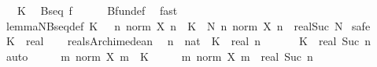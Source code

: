 \begin{isabellebody}
\ {\isacartoucheopen}{}\ {\isacharless}{\kern0pt}\ K{\isacartoucheclose}\ \isamarkupfalse%
\ {\isachardoublequoteopen}Bseq\ f{\isachardoublequoteclose}\isanewline
\ \ \ \ \isamarkupfalse%
\ Bfun{\isacharunderscore}{\kern0pt}def\ \isamarkupfalse%
\ fast\isanewline
{}\isamarkupfalse%
%
\endisatagproof
{\isafoldproof}%
%
\isadelimproof
\isanewline
%
\endisadelimproof
\isanewline
{}\isamarkupfalse%
\ lemma{\isacharunderscore}{\kern0pt}NBseq{\isacharunderscore}{\kern0pt}def{\isacharcolon}{\kern0pt}\ {\isachardoublequoteopen}{\isacharparenleft}{\kern0pt}{\isasymexists}K\ {\isachargreater}{\kern0pt}\ {}{\isachardot}{\kern0pt}\ {\isasymforall}n{\isachardot}{\kern0pt}\ norm\ {\isacharparenleft}{\kern0pt}X\ n{\isacharparenright}{\kern0pt}\ {\isasymle}\ K{\isacharparenright}{\kern0pt}\ {\isasymlongleftrightarrow}\ {\isacharparenleft}{\kern0pt}{\isasymexists}N{\isachardot}{\kern0pt}\ {\isasymforall}n{\isachardot}{\kern0pt}\ norm\ {\isacharparenleft}{\kern0pt}X\ n{\isacharparenright}{\kern0pt}\ {\isasymle}\ real{\isacharparenleft}{\kern0pt}Suc\ N{\isacharparenright}{\kern0pt}{\isacharparenright}{\kern0pt}{\isachardoublequoteclose}\isanewline
%
\isadelimproof
%
\endisadelimproof
%
\isatagproof
{}\isamarkupfalse%
\ safe\isanewline
\ \ \isamarkupfalse%
\ K\ {\isacharcolon}{\kern0pt}{\isacharcolon}{\kern0pt}\ real\isanewline
\ \ \isamarkupfalse%
\ reals{\isacharunderscore}{\kern0pt}Archimedean{}\ \isamarkupfalse%
\ n\ {\isacharcolon}{\kern0pt}{\isacharcolon}{\kern0pt}\ nat\ \ {\isachardoublequoteopen}K\ {\isacharless}{\kern0pt}\ real\ n{\isachardoublequoteclose}\ \isacommand{{\isachardot}{\kern0pt}{\isachardot}{\kern0pt}}\isamarkupfalse%
\isanewline
\ \ \isamarkupfalse%
\ \isamarkupfalse%
\ {\isachardoublequoteopen}K\ {\isasymle}\ real\ {\isacharparenleft}{\kern0pt}Suc\ n{\isacharparenright}{\kern0pt}{\isachardoublequoteclose}\ \isamarkupfalse%
\ auto\isanewline
\ \ \isamarkupfalse%
\ \isamarkupfalse%
\ {\isachardoublequoteopen}{\isasymforall}m{\isachardot}{\kern0pt}\ norm\ {\isacharparenleft}{\kern0pt}X\ m{\isacharparenright}{\kern0pt}\ {\isasymle}\ K{\isachardoublequoteclose}\isanewline
\ \ \isamarkupfalse%
\ \isamarkupfalse%
\ {\isachardoublequoteopen}{\isasymforall}m{\isachardot}{\kern0pt}\ norm\ {\isacharparenleft}{\kern0pt}X\ m{\isacharparenright}{\kern0pt}\ {\isasymle}\ real\ {\isacharparenleft}{\kern0pt}Suc\ n{\isacharparenright}{\kern0pt}{\isachardoublequoteclose}\isanewline

\end{isabellebody}
